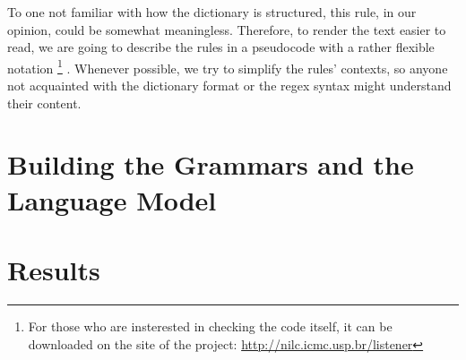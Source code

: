 To one not familiar with how the dictionary is structured, this rule, in our opinion, could be somewhat meaningless. Therefore, to 
render the text easier to read, we are going to describe the rules in a pseudocode with a rather flexible notation
\footnote{For those who are insterested in checking the code itself, it can be downloaded on the site of the project:
\url{http://nilc.icmc.usp.br/listener}}
.
Whenever possible, we try to simplify the rules' contexts, so anyone not acquainted with the dictionary format or the
\ac{regex} syntax might understand their content.

\section{Building the Grammars and the Language Model}
\section{Results}



